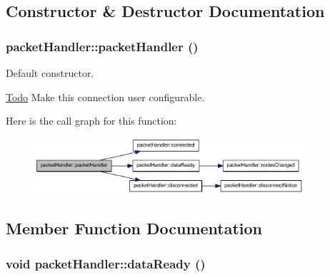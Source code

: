 \subsection{Constructor \& Destructor Documentation}
\hypertarget{classpacketHandler_a02936b9105618ed38701274efcfa0dfb}{
\subsubsection[{packetHandler}]{\setlength{\rightskip}{0pt plus 5cm}packetHandler::packetHandler ()}}
\label{classpacketHandler_a02936b9105618ed38701274efcfa0dfb}


Default constructor. 



\begin{Desc}
\item[\hyperlink{todo__todo000004}{Todo}]Make this connection user configurable. \end{Desc}




Here is the call graph for this function:\nopagebreak
\begin{figure}[H]
\begin{center}
\leavevmode
\includegraphics[width=283pt]{classpacketHandler_a02936b9105618ed38701274efcfa0dfb_cgraph}
\end{center}
\end{figure}




\subsection{Member Function Documentation}
\hypertarget{classpacketHandler_a9085a61a51eccc7acb240a7b68601686}{
\subsubsection[{dataReady}]{\setlength{\rightskip}{0pt plus 5cm}void packetHandler::dataReady ()}}
\label{classpacketHandler_a9085a61a51eccc7acb240a7b68601686}


